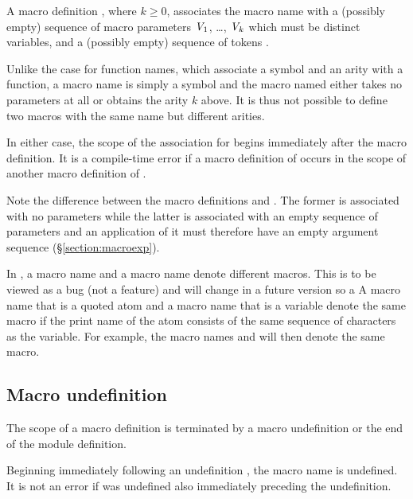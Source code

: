 A macro definition
, where
$k\geq0$, associates the macro name  with a (possibly empty)
sequence of macro parameters ${\it V}_1$, \ldots, ${\it V}_k$ which must
be distinct variables, and a (possibly empty) sequence of tokens
.

Unlike the case for function names, which associate a symbol and an
arity with a function, a macro name is simply a symbol and the macro
named  either takes no parameters at all or obtains the arity
$k$ above.  It is thus not possible to define two macros with the same
name  but different arities.

In either case, the scope of the association for  begins
immediately after the macro definition.  It is a compile-time error if
a macro definition of  occurs in the scope of another macro
definition of .

Note the difference between the macro definitions 
and .  The former is associated with no
parameters while the latter is associated with an empty sequence of
parameters and an application of it must therefore have an empty
argument sequence (\S\ref{section:macroexp}).

\ifOld
In \OldErlang, a macro name  and a macro name  denote
different macros.  This is to be viewed as a bug (not a feature) and
will change in a future version so a
\fi
\ifStd
A
\fi
macro name that is a quoted atom and a macro name that is a variable
denote the same macro if the print name of the atom consists of the
same sequence of characters as the variable.  For example, the macro
names  and  \ifOld will then \fi denote the same
macro.


\subsection{Macro undefinition}

\label{section:macroundef}

The scope of a macro definition is terminated by a macro undefinition or the end of the
module definition.
\begin{rules}
       {\TXT{-}  \TXT{(}  \TXT{)} }
\end{rules}
Beginning immediately following an undefinition ,
the macro name  is undefined.
It is not an error if  was undefined also immediately preceding the undefinition.

